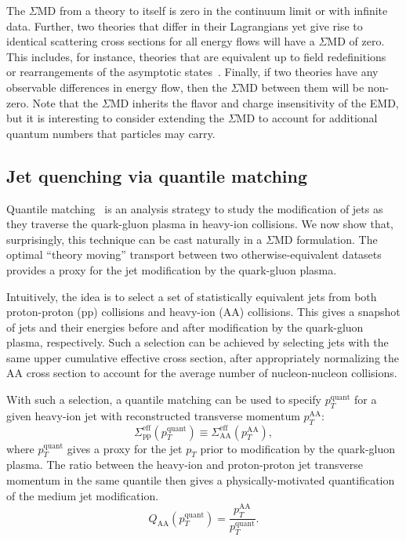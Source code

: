\documentclass[letterpaper,11pt]{article}
\begin{document}
The $\Sigma$MD from a theory to itself is zero in the continuum limit or with infinite data.
%
Further, two theories that differ in their Lagrangians yet give rise to identical scattering cross sections for all energy flows will have a $\Sigma$MD of zero.
%
This includes, for instance, theories that are equivalent up to field redefinitions~\cite{Cheung:2017pzi} or rearrangements of the asymptotic states~\cite{Frye:2018xjj,Hannesdottir:2019rqq,Hannesdottir:2019opa}.
%
Finally, if two theories have any observable differences in energy flow, then the $\Sigma$MD between them will be non-zero.
%
Note that the $\Sigma$MD inherits the flavor and charge insensitivity of the EMD, but it is interesting to consider extending the $\Sigma$MD to account for additional quantum numbers that particles may carry.


\subsection{Jet quenching via quantile matching}


Quantile matching~\cite{Brewer:2018dfs} is an analysis strategy to study the modification of jets as they traverse the quark-gluon plasma in heavy-ion collisions.
%
We now show that, surprisingly, this technique can be cast naturally in a $\Sigma$MD formulation.
%
The optimal ``theory moving'' transport between two otherwise-equivalent datasets provides a proxy for the jet modification by the quark-gluon plasma.


Intuitively, the idea is to select a set of statistically equivalent jets from both proton-proton (pp) collisions and heavy-ion (AA) collisions.
%
This gives a snapshot of jets and their energies before and after modification by the quark-gluon plasma, respectively.
%
Such a selection can be achieved by selecting jets with the same upper cumulative effective cross section, after appropriately normalizing the AA cross section to account for the average number of nucleon-nucleon collisions.


With such a selection, a quantile matching can be used to specify $p_T^\text{quant}$ for a given heavy-ion jet with reconstructed transverse momentum $p_T^\text{AA}$:
%
\begin{equation}
\Sigma^\text{eff}_\text{pp}(p_T^\text{quant}) \equiv \Sigma_\text{AA}^\text{eff}(p_T^\text{AA}),
\end{equation}
%
where $p_T^\text{quant}$ gives a proxy for the jet $p_T$ prior to modification by the quark-gluon plasma.
%
The ratio between the heavy-ion and proton-proton jet transverse momentum in the same quantile then gives a physically-motivated quantification of the medium jet modification.
\begin{equation}
Q_\text{AA}(p_T^\text{quant}) = \frac{p_T^\text{AA}}{p_T^\text{quant}}.
\end{equation}
\end{document}
